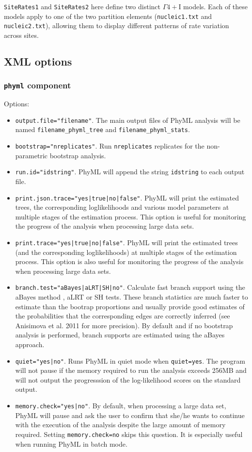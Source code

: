 \documentclass[a4paper,12pt]{article}
\newcommand{\x}[1]{\texttt{#1}}
\begin{document}
\x{SiteRates1} and \x{SiteRates2} here define two distinct $\Gamma4+$I models. Each of these models apply to
one of the two partition elements (\x{nucleic1.txt} and \x{nucleic2.txt}), allowing them to display
different patterns of rate variation across sites.


\subsection{XML options}
\subsubsection{{\tt phyml} component}
Options:
\begin{itemize}
\item \x{output.file="filename"}. The main output files of PhyML analysis will be named
  \x{filename\_phyml\_tree} and \x{filename\_phyml\_stats}.
\item \x{bootstrap="nreplicates"}. Run \x{nreplicates} replicates for the non-parametric bootstrap analysis.
\item \x{run.id="idstring"}. PhyML will append the string \x{idstring} to each output file.
\item \x{print.json.trace="yes|true|no|false"}. PhyML will print the estimated trees, the
  corresponding loglikelihoods and various model parameters at multiple stages of the estimation process. This option is useful
  for monitoring the progress of the analysis when processing large data sets.
\item \x{print.trace="yes|true|no|false"}. PhyML will print the estimated trees (and the
  corresponding loglikelihoods) at multiple stages of the estimation process. This option is also useful
  for monitoring the progress of the analysis when processing large data sets.
\item \x{branch.test="aBayes|aLRT|SH|no"}. Calculate fast branch support using the aBayes method
  \cite{anisimova11}, aLRT \cite{anisimova06} or SH \cite{shimodaira99} tests. These branch
  statistics are much faster to estimate than the bootrap proportions and usually provide good
  estimates of the probabilities that the corresponding edges are correctly inferred (see Anisimova et
  al. 2011 for more precision). By default and if no bootstrap analysis is performed, branch supports
  are estimated using the aBayes approach.
\item \x{quiet="yes|no"}. Runs PhyML in quiet mode when \x{quiet=yes}. The program will not pause if the memory required to run the analysis
exceeds 256MB and will not output the progresssion of the log-likelihood scores on the standard output.
\item \x{memory.check="yes|no"}. By default, when processing a large data set, PhyML will pause and ask the user to confirm that
she/he wants to continue with the execution of the analysis despite the large amount of memory
required. Setting \x{memory.check=no}  skips this question. It is especially useful when running
PhyML in batch mode.



\end{itemize}
\end{document}
